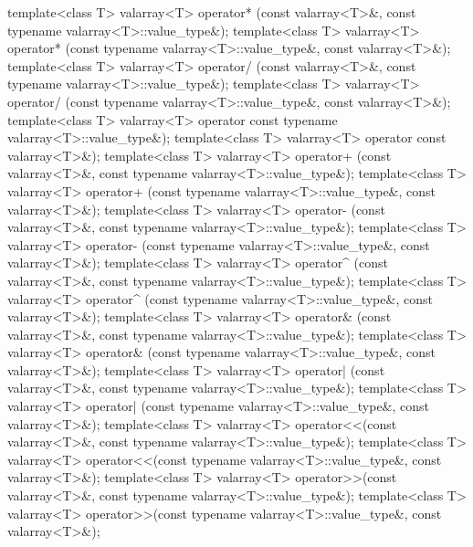 \begin{itemdecl}
template<class T> valarray<T> operator* (const valarray<T>&,
                                         const typename valarray<T>::value_type&);
template<class T> valarray<T> operator* (const typename valarray<T>::value_type&,
                                         const valarray<T>&);
template<class T> valarray<T> operator/ (const valarray<T>&,
                                         const typename valarray<T>::value_type&);
template<class T> valarray<T> operator/ (const typename valarray<T>::value_type&,
                                         const valarray<T>&);
template<class T> valarray<T> operator%
                                         const typename valarray<T>::value_type&);
template<class T> valarray<T> operator%
                                         const valarray<T>&);
template<class T> valarray<T> operator+ (const valarray<T>&,
                                         const typename valarray<T>::value_type&);
template<class T> valarray<T> operator+ (const typename valarray<T>::value_type&,
                                         const valarray<T>&);
template<class T> valarray<T> operator- (const valarray<T>&,
                                         const typename valarray<T>::value_type&);
template<class T> valarray<T> operator- (const typename valarray<T>::value_type&,
                                         const valarray<T>&);
template<class T> valarray<T> operator^ (const valarray<T>&,
                                         const typename valarray<T>::value_type&);
template<class T> valarray<T> operator^ (const typename valarray<T>::value_type&,
                                         const valarray<T>&);
template<class T> valarray<T> operator& (const valarray<T>&,
                                         const typename valarray<T>::value_type&);
template<class T> valarray<T> operator& (const typename valarray<T>::value_type&,
                                         const valarray<T>&);
template<class T> valarray<T> operator| (const valarray<T>&,
                                         const typename valarray<T>::value_type&);
template<class T> valarray<T> operator| (const typename valarray<T>::value_type&,
                                         const valarray<T>&);
template<class T> valarray<T> operator<<(const valarray<T>&,
                                         const typename valarray<T>::value_type&);
template<class T> valarray<T> operator<<(const typename valarray<T>::value_type&,
                                         const valarray<T>&);
template<class T> valarray<T> operator>>(const valarray<T>&,
                                         const typename valarray<T>::value_type&);
template<class T> valarray<T> operator>>(const typename valarray<T>::value_type&,
                                         const valarray<T>&);
\end{itemdecl}

